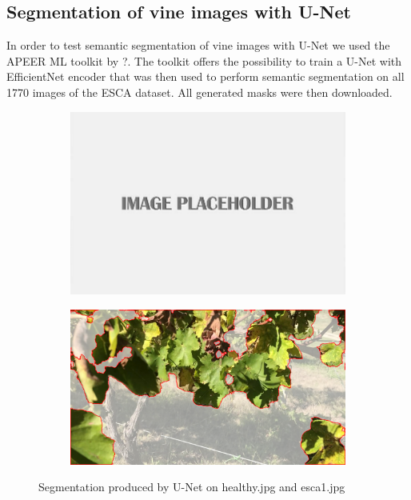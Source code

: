 \documentclass[runningheads]{llncs}
\begin{document}
\subsection{Segmentation of vine images with U-Net}

In order to test semantic segmentation of vine images with U-Net we used the APEER ML toolkit by { ?}. The toolkit offers the possibility to train a U-Net with EfficientNet encoder that was then used to perform semantic segmentation on all 1770 images of the ESCA dataset. All generated masks were then downloaded.

\begin{figure}[h!]
\centering
\begin{subfigure}[b]{.47\linewidth}
\includegraphics[width=\linewidth]{imgs/placeholder.jpg}
\caption{}
\end{subfigure}
\begin{subfigure}[b]{.47\linewidth}
\includegraphics[width=\linewidth]{imgs/healthy_033_cam3_finalprediction_over_healthy_033_cam3.png}
\caption{}
\end{subfigure}
\caption{Segmentation produced by U-Net on {\color{red}healthy.jpg} and {\color{red}esca1.jpg}}
\label{fig:unet_segmentation}
\end{figure}
\end{document}
